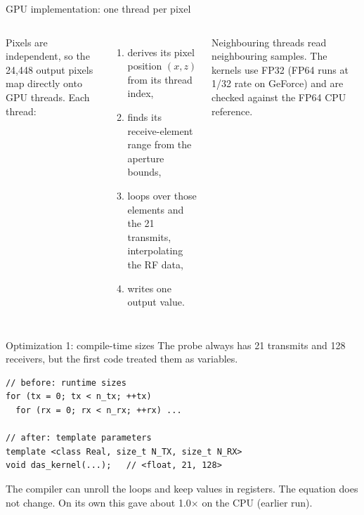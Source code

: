 \documentclass[aspectratio=169,10pt]{beamer}
\begin{document}
\begin{frame}{GPU implementation: one thread per pixel}
  \begin{columns}[T,onlytextwidth]
    \centering
    \small
    Pixels are independent, so the 24,448 output pixels map directly onto GPU threads. Each thread:
    \begin{enumerate}\setlength\itemsep{.2em}
      \item derives its pixel position $(x,z)$ from its thread index,
      \item finds its receive-element range from the aperture bounds,
      \item loops over those elements and the 21 transmits, interpolating the RF data,
      \item writes one output value.
    \end{enumerate}
    Neighbouring threads read neighbouring samples. The kernels use FP32 (FP64 runs at 1/32 rate on GeForce) and are checked against the FP64 CPU reference.
  \end{columns}
\end{frame}

\begin{frame}[fragile]{Optimization 1: compile-time sizes}
  The probe always has 21 transmits and 128 receivers, but the first code treated them as variables.
  \begin{lstlisting}
// before: runtime sizes
for (tx = 0; tx < n_tx; ++tx)
  for (rx = 0; rx < n_rx; ++rx) ...

// after: template parameters
template <class Real, size_t N_TX, size_t N_RX>
void das_kernel(...);   // <float, 21, 128>
  \end{lstlisting}
  \small The compiler can unroll the loops and keep values in registers. The equation does not change. On its own this gave about 1.0$\times$ on the CPU (earlier run).
\end{frame}
\end{document}
